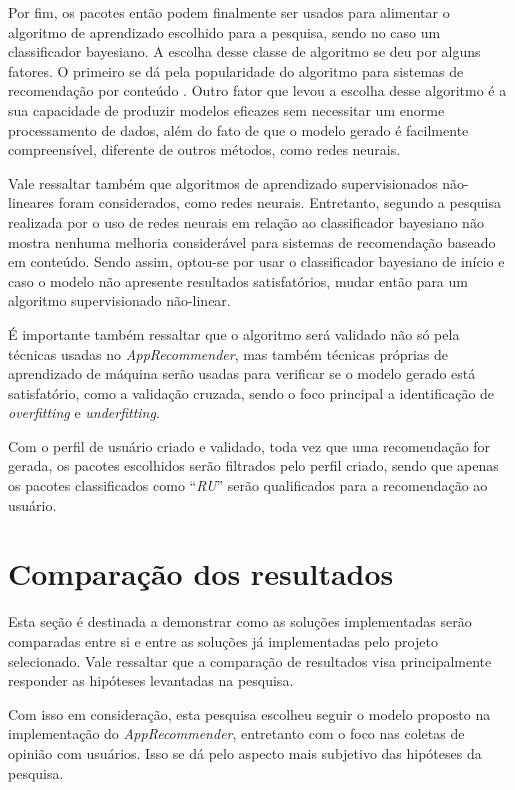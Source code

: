 Por fim, os pacotes então podem finalmente ser usados para alimentar o algoritmo de aprendizado escolhido para a pesquisa, sendo no caso um
classificador bayesiano. A escolha desse classe de algoritmo se deu por alguns fatores. O primeiro se dá pela popularidade do algoritmo para
sistemas de recomendação por conteúdo \cite{amatriain2011data}. Outro fator que levou a escolha desse algoritmo é a sua capacidade de produzir
modelos eficazes sem necessitar um enorme processamento de dados, além do fato
de que o modelo gerado é facilmente compreensível, diferente de outros métodos,
como redes neurais\cite{segaran2007programming}.

Vale ressaltar também que algoritmos de aprendizado supervisionados não-lineares foram considerados, como redes neurais. Entretanto, segundo
a pesquisa realizada por \cite{pazzani1997learning} o uso de redes neurais em relação ao classificador bayesiano não mostra nenhuma melhoria
considerável para sistemas de recomendação baseado em conteúdo. Sendo assim, optou-se por usar o
classificador bayesiano de início e caso o modelo não apresente
resultados satisfatórios, mudar então para um algoritmo supervisionado não-linear.

É importante também ressaltar que o algoritmo será validado não só pela técnicas
usadas no \textit{AppRecommender}, mas também técnicas próprias de
aprendizado de máquina serão usadas para verificar se o modelo gerado está
satisfatório, como a validação cruzada, sendo o foco principal a
identificação de \textit{overfitting} e \textit{underfitting}.

Com o perfil de usuário criado e validado, toda vez que uma recomendação for gerada, os pacotes escolhidos serão filtrados pelo perfil criado,
sendo que apenas os pacotes classificados como ``\textit{RU}'' serão qualificados para a recomendação ao usuário.

\section{Comparação dos resultados}

Esta seção é destinada a demonstrar como as soluções implementadas serão
comparadas entre si e entre as soluções já implementadas pelo projeto
selecionado. Vale ressaltar que a comparação de resultados visa principalmente
responder as hipóteses levantadas na pesquisa.

Com isso em consideração, esta pesquisa escolheu seguir o modelo proposto na
implementação do \textit{AppRecommender}, entretanto com o foco nas
coletas de opinião com usuários. Isso se dá pelo aspecto mais subjetivo das
hipóteses da pesquisa.

